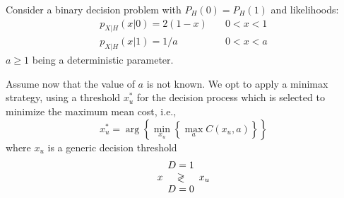 \else

\question Consider a binary decision problem with $P_H(0) = P_H(1)$ and likelihoods:
 $$\begin{array}{ll}
 p_{X|H}(x|0)=2 \left(1-x \right) & \quad 0<x<1 \\
  p_{X|H}(x|1)=1/a & \quad 0<x<a
 \end{array}$$
$a\geq1$ being a deterministic parameter.
Assume now that the value of $a$ is not known. We opt to apply a minimax strategy, using a threshold $x_u^*$ for the decision process which is selected to minimize the maximum mean cost, i.e., 
 $$x_u^*=\arg \left\lbrace \min_{x_u}  \left\lbrace \max_a C(x_u,a)   \right\rbrace   \right\rbrace  $$
where $x_u$ is a generic decision threshold
		 $$x \begin{array}{c} D=1 \\ \gtrless \\ D=0 \end{array} x_u$$

\begin{solution}
\end{solution}

\fi